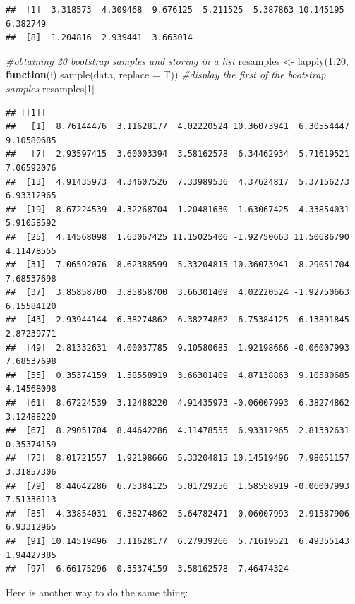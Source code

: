 \documentclass[
]{book}
\newenvironment{Shaded}{\begin{snugshade}}{\end{snugshade}}
\newcommand{\AttributeTok}[1]{\textcolor[rgb]{0.77,0.63,0.00}{#1}}
\newcommand{\CommentTok}[1]{\textcolor[rgb]{0.56,0.35,0.01}{\textit{#1}}}
\newcommand{\ControlFlowTok}[1]{\textcolor[rgb]{0.13,0.29,0.53}{\textbf{#1}}}
\newcommand{\DecValTok}[1]{\textcolor[rgb]{0.00,0.00,0.81}{#1}}
\newcommand{\FunctionTok}[1]{\textcolor[rgb]{0.00,0.00,0.00}{#1}}
\newcommand{\NormalTok}[1]{#1}
\newcommand{\OtherTok}[1]{\textcolor[rgb]{0.56,0.35,0.01}{#1}}
\newcommand{\SpecialCharTok}[1]{\textcolor[rgb]{0.00,0.00,0.00}{#1}}
\theoremstyle{definition}
\theoremstyle{definition}
\theoremstyle{definition}
\theoremstyle{definition}
\theoremstyle{remark}
\begin{document}
\begin{verbatim}
##  [1]  3.318573  4.309468  9.676125  5.211525  5.387863 10.145195  6.382749
##  [8]  1.204816  2.939441  3.663014
\end{verbatim}

\begin{Shaded}
\begin{Highlighting}[]
\CommentTok{\#obtaining 20 bootstrap samples and storing in a list}
\NormalTok{resamples }\OtherTok{\textless{}{-}} \FunctionTok{lapply}\NormalTok{(}\DecValTok{1}\SpecialCharTok{:}\DecValTok{20}\NormalTok{, }\ControlFlowTok{function}\NormalTok{(i) }\FunctionTok{sample}\NormalTok{(data, }\AttributeTok{replace =}\NormalTok{ T))}
\CommentTok{\#display the first of the bootstrap samples}
\NormalTok{resamples[}\DecValTok{1}\NormalTok{]}
\end{Highlighting}
\end{Shaded}

\begin{verbatim}
## [[1]]
##   [1]  8.76144476  3.11628177  4.02220524 10.36073941  6.30554447  9.10580685
##   [7]  2.93597415  3.60003394  3.58162578  6.34462934  5.71619521  7.06592076
##  [13]  4.91435973  4.34607526  7.33989536  4.37624817  5.37156273  6.93312965
##  [19]  8.67224539  4.32268704  1.20481630  1.63067425  4.33854031  5.91058592
##  [25]  4.14568098  1.63067425 11.15025406 -1.92750663 11.50686790  4.11478555
##  [31]  7.06592076  8.62388599  5.33204815 10.36073941  8.29051704  7.68537698
##  [37]  3.85858700  3.85858700  3.66301409  4.02220524 -1.92750663  6.15584120
##  [43]  2.93944144  6.38274862  6.38274862  6.75384125  6.13891845  2.87239771
##  [49]  2.81332631  4.00037785  9.10580685  1.92198666 -0.06007993  7.68537698
##  [55]  0.35374159  1.58558919  3.66301409  4.87138863  9.10580685  4.14568098
##  [61]  8.67224539  3.12488220  4.91435973 -0.06007993  6.38274862  3.12488220
##  [67]  8.29051704  8.44642286  4.11478555  6.93312965  2.81332631  0.35374159
##  [73]  8.01721557  1.92198666  5.33204815 10.14519496  7.98051157  3.31857306
##  [79]  8.44642286  6.75384125  5.01729256  1.58558919 -0.06007993  7.51336113
##  [85]  4.33854031  6.38274862  5.64782471 -0.06007993  2.91587906  6.93312965
##  [91] 10.14519496  3.11628177  6.27939266  5.71619521  6.49355143  1.94427385
##  [97]  6.66175296  0.35374159  3.58162578  7.46474324
\end{verbatim}

Here is another way to do the same thing:
\end{document}
